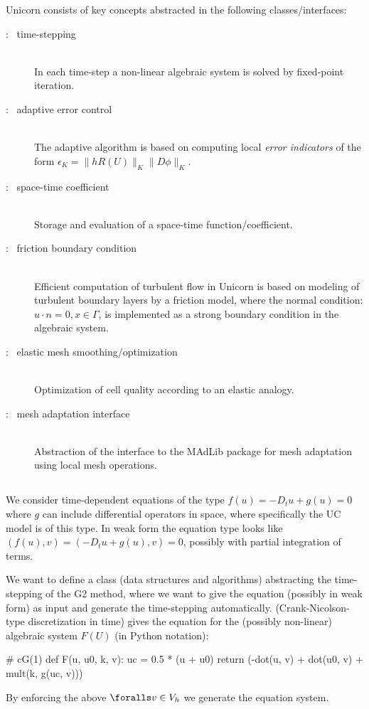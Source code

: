 Unicorn consists of key concepts abstracted in the following
classes/interfaces:
\begin{description}
\item[: \ time-stepping]
\ \\
In each time-step a non-linear algebraic system is solved by
fixed-point iteration.
\item[: \ adaptive error control]
\ \\
The adaptive algorithm is based on computing local {\em error
indicators} of the form $\epsilon_K = \|h R(U)\|_K \|D \phi\|_K$.

\item[: \ space-time coefficient]
\ \\
Storage and evaluation of a space-time function/coefficient.
\item[: \ friction boundary condition]
\ \\
Efficient computation of turbulent flow in Unicorn is based on modeling
of turbulent boundary layers by a friction model, where the normal
condition: $u \cdot n = 0, x \in \Gamma$, is implemented as a strong
boundary condition in the algebraic system.
\item[: \ elastic mesh smoothing/optimization]
\ \\
Optimization of cell quality according to an elastic analogy.
\item[: \ mesh adaptation interface]
\ \\
Abstraction of the interface to the MAdLib package for mesh adaptation
using local mesh operations.
\end{description}

\subsection{}

We consider time-dependent equations of the type $f(u) = -D_t u +
g(u) = 0$ where $g$ can include differential operators in space, where
specifically the UC model is of this type. In weak form the equation type
looks like$(f(u), v) = (-D_t u + g(u), v) = 0$, possibly with partial
integration of terms.

We want to define a class (data structures and algorithms) abstracting
the time-stepping of the G2 method, where we want to give the equation
(possibly in weak form) as input and generate the time-stepping
automatically. \cgone{}\cgone{} (Crank-Nicolson-type discretization in
time) gives the equation for the (possibly non-linear) algebraic system
$F(U)$ (in Python notation):
\begin{python}
# cG(1)
def F(u, u0, k, v):
    uc = 0.5 * (u + u0)
    return (-dot(u, v) + dot(u0, v) + mult(k, g(uc, v)))
\end{python}
By enforcing the above $\foralls v \in V_h$ we generate the equation
system.

